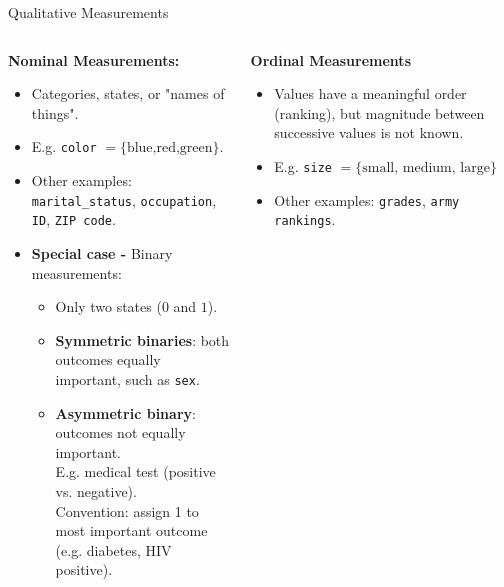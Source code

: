 \begin{frame}{Qualitative Measurements}
	\begin{columns}[t]
		\begin{column}{0.45\columnwidth}
			\centering \textbf{Nominal Measurements:}
			\begin{itemize}
				\item Categories, states, or "names of things".
				\item E.g. \texttt{color} $= \{\text{blue,red,green}\}$.
				\item Other examples: \texttt{marital\_status}, \texttt{occupation}, \texttt{ID}, \texttt{ZIP code}.
				\item \textbf{Special case -} Binary measurements:
				      \begin{itemize}
					      \item Only two states ($0$ and $1$).
					      \item \textbf{Symmetric binaries}: both outcomes equally important, such as \texttt{sex}.
					      \item \textbf{Asymmetric binary}: outcomes not equally important. \\
					            E.g. medical test (positive vs. negative).\\
					            Convention: assign 1 to most important outcome (e.g. diabetes, HIV positive).
				      \end{itemize}
			\end{itemize}
		\end{column}
		\begin{column}{0.45\columnwidth}
			\centering \textbf{Ordinal Measurements}
			\begin{itemize}
				\item Values have a meaningful order (ranking), but magnitude between successive values is not known.
				\item E.g. \texttt{size} $= \{\text{small, medium, large}\}$
				\item Other examples: \texttt{grades}, \texttt{army rankings}.
			\end{itemize}
		\end{column}
	\end{columns}
\end{frame}

